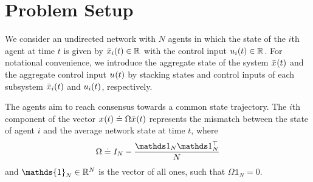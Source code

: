 
\section{Problem Setup}\label{sec:setup}

We consider {an undirected network} with $ N $ agents 
{in which the state of the $ i $th agent at time $ t $ is given by $ \bar{x}_{i}(t)\in{ {\mathbb R}^{} } $ with the control input $ u_{i}(t)\in{ {\mathbb R}^{} } $.}
For {notational} convenience,
we {introduce} the aggregate {state of the} system  $ \bar{x}_{}(t) $ and {the}
aggregate control input $ u_{}(t) $ {by stacking states and control inputs of each subsystem} $ \bar{x}_{i}(t) $ and $ u_{i}(t) $, 
respectively.

\iffalse
\begin{rem}[Network topology]
	While in the first part of the paper we focus on circular formations for the sake of analysis and ease of presentation,
	the control design can be readily extended to generic undirected topologies.
	We discuss theoretical guarantees in~\autoref{sec:generic-topology} and observe with computational experiments in~\autoref{sec:numerical-results}
	that the \tradeoff holds regardless of the specific topology. %
\end{rem}
\fi

The agents aim to reach consensus towards a common state trajectory. 
The $i$th component of the vector $ x_{}(t) \doteq \Omega\bar{x}_{}(t) $ represents 
the mismatch between the state of agent $ i $ and the average network state at time $ t $,
where
\begin{equation}\label{eq:error-matrix}
	\Omega \doteq I_{N}-\consMatrix
\end{equation}
and $ \mathds{1}_N \in\Real{N} $ is the vector of all ones,
such that $ \Omega\mathds{1}_N=0 $.


